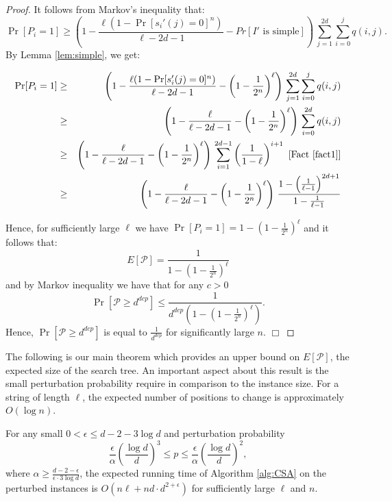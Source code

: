 \begin{proof}
\noindent It follows from Markov's inequality that: $$\Pr[P_i  = 1] \geq  \left( 1 -\frac{\ell (1 - \Pr[s_i'(j) = 0]^n)}{\ell - 2d - 1} -  Pr[I' \mbox{  is simple}] \right) \, \sum_{j = 1}^{2d} \sum_{i = 0}^j q(i,j).$$  By Lemma \ref{lem:simple}, we get:

\begin{eqnarray*}
\Pr[P_i  = 1]	& \geq &  \left( 1 -\frac{\ell (1 - \Pr[s_i'(j) = 0]^n)}{\ell - 2d - 1} - \left( 1 - \frac{1}{2^n}\right)^{\ell} \right) \, \sum_{j = 1}^{2d} \sum_{i = 0}^j q(i,j)  \\
					 	& \geq & \left( 1 -\frac{\ell}{\ell - 2d - 1} - \left( 1 - \frac{1}{2^n}\right)^{\ell} \right)\, \sum_{i = 0}^{2d} q(i,j) \\
					 	& \geq & \left( 1 -\frac{\ell}{\ell - 2d - 1} - \left( 1 - \frac{1}{2^n}\right)^{\ell} \right) \, \sum_{i = 1}^{2d - 1} \left( \frac{1}{1 - \ell} \right)^{i + 1}  \, \, \mbox{[Fact \ref{fact1}]} \\
					 	& \geq & \left( 1 -\frac{\ell}{\ell - 2d - 1} - \left( 1 - \frac{1}{2^n}\right)^{\ell} \right) \, \frac{1 - \left(\frac{1}{\ell -1 } \right)^{2d + 1}}{1 - \frac{1}{\ell - 1}}
\end{eqnarray*}

\noindent Hence, for sufficiently large $\ell$ we have $\Pr[P_i = 1] = 1 - \left( 1 - \frac{1}{2^n}\right)^{\ell}$ and it follows that: $$E[\mathcal{P}] = \frac{1}{1 - \left( 1 - \frac{1}{2^n}\right)^{\ell}}$$ and by Markov inequality we have that for any $c > 0$ $$\Pr[\mathcal{P} \geq d^{dcp}] \leq \frac{1}{d^{dcp} \left(1 - \left( 1 - \frac{1}{2^n}\right)^{\ell}\right)}.$$  Hence, $\Pr[\mathcal{P} \geq d^{dcp}]$ is equal to $ \frac{1}{d^{dcp}}$ for significantly large $n$. \hfill $\Box$ \end{proof}

The following is our main theorem which provides an upper bound on $E[\mathcal{P}]$, the expected size of the search tree.  An important aspect about this result is the small perturbation probability require in comparison to the instance size.  For a string of length $\ell$, the expected number of positions to change is approximately $O(\log n)$. 

\begin{theorem}  For any small $0 < \epsilon \leq d - 2 - 3 \log d$ and perturbation probability $$\frac{\epsilon}{\alpha} \left( \frac{\log d}{d} \right)^3 \leq p \leq \frac{\epsilon}{\alpha} \left( \frac{\log d}{d} \right)^2,$$ where $\alpha \geq \frac{d - 2 - \epsilon}{\epsilon \cdot 3 \log d}$, the expected running time of Algorithm \ref{alg:CSA} on the perturbed instances is $O(n \ell + n d \cdot d^{2 + \epsilon})$ for sufficiently large $\ell$ and $n$. \end{theorem}

